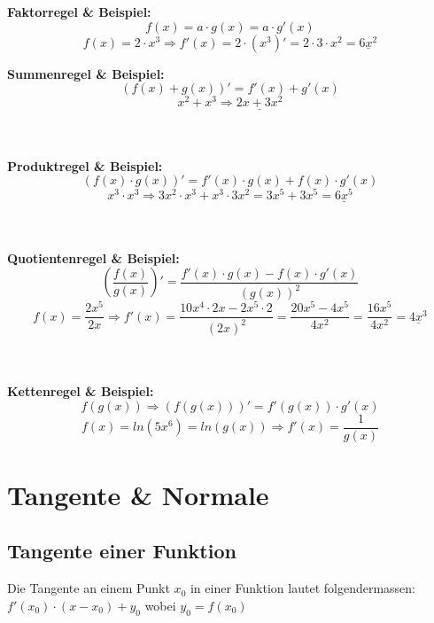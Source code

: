 \documentclass[12pt]{scrartcl}
\begin{document}
\begin{center}
\textbf{Faktorregel \& Beispiel:} 
\[ f(x) = a \cdot g(x) = a \cdot g'(x)\]
\[f(x)=2 \cdot x^3 \Rightarrow f'(x)=2 \cdot (x^3)' = 2 \cdot 3 \cdot x^2 = \underline{6x^2}\]

\newpage
\textbf{Summenregel \& Beispiel:} 
\[ (f(x) + g(x))' = f'(x) + g'(x) \]
\[ x^2 + x^3 \Rightarrow \underline{2x + 3x^2}\]

\hspace{0pt} \\
\hspace{0pt} \\
\noindent
\textbf{Produktregel \& Beispiel:} 
\[ (f(x) \cdot g(x))' =  f'(x) \cdot g(x) + f(x) \cdot g'(x)\]
\[x^3 \cdot x^3 \Rightarrow 3x^2 \cdot x^3 + x^3 \cdot 3x^2 = 3x^5 + 3x^5 = \underline{6x^5}\]


\hspace{0pt} \\
\hspace{0pt} \\
\noindent
\textbf{Quotientenregel \& Beispiel:} 
\[\left(\frac{f(x)}{g(x)}\right)' = \frac{f'(x) \cdot g(x) - f(x) \cdot g'(x)}{(g(x))^2}\]
\[f(x)= \frac{2x^5}{2x} \Rightarrow f'(x) = \frac{10x^4 \cdot 2x - 2x^5 \cdot 2}{(2x)^2} = \frac{20x^5 - 4x^5}{4x^2} = \frac{16x^5}{4x^2} = \underline{4x^3}\]

\hspace{0pt} \\
\hspace{0pt} \\
\noindent
\textbf{Kettenregel \& Beispiel:} 
\[f(g(x)) \Rightarrow (f(g(x)))' = f'(g(x)) \cdot g'(x)\]
\[f(x) = ln(5x^6) = ln(g(x)) \Rightarrow f'(x) = \frac{1}{g(x)}\]


\end{center}

\newpage

\section{Tangente \& Normale}
\subsection{Tangente einer Funktion}
Die Tangente an einem Punkt $x_0$ in einer Funktion lautet folgendermassen:\\
$ f'(x_0) \cdot (x - x_0) + y_0$ wobei $y_0 = f(x_0)$\\
\end{document}
